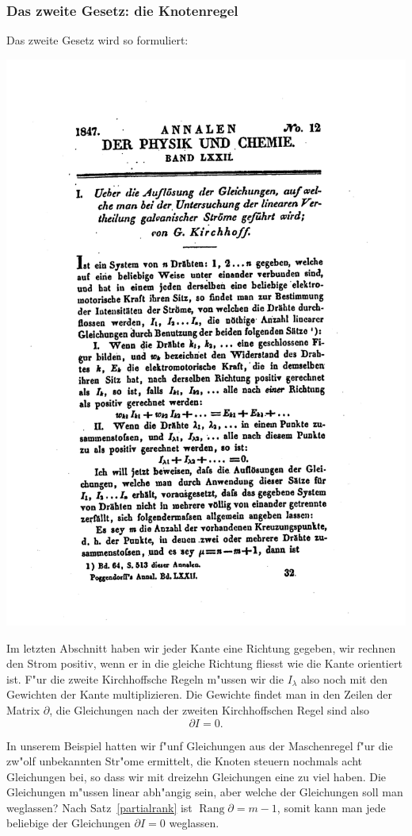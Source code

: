 \subsubsection{Das zweite Gesetz: die Knotenregel}
Das zweite Gesetz wird so formuliert:
\bigskip
\begin{center}
\includegraphics[width=0.7\hsize]{graphics/kh2}
\end{center}
\bigskip
Im letzten Abschnitt haben wir jeder Kante eine Richtung gegeben,
wir rechnen den Strom positiv, wenn er in die gleiche Richtung fliesst
wie die Kante orientiert ist. F"ur die zweite Kirchhoffsche Regeln
m"ussen wir die $I_\lambda$ also noch mit den Gewichten der Kante
multiplizieren. Die Gewichte findet man in den Zeilen der Matrix
$\partial$, die Gleichungen nach der zweiten Kirchhoffschen
Regel sind also
\[
\partial I=0.
\]

In unserem Beispiel hatten wir f"unf Gleichungen aus der Maschenregel
f"ur die zw"olf unbekannten Str"ome ermittelt, die Knoten steuern
nochmals acht Gleichungen bei, so dass wir mit dreizehn Gleichungen
eine zu viel haben. Die Gleichungen m"ussen linear abh"angig sein,
aber welche der Gleichungen soll man weglassen?
Nach Satz~\ref{partialrank} ist $\operatorname{Rang}\partial=m-1$,
somit kann man jede beliebige der Gleichungen $\partial I=0$ weglassen.

